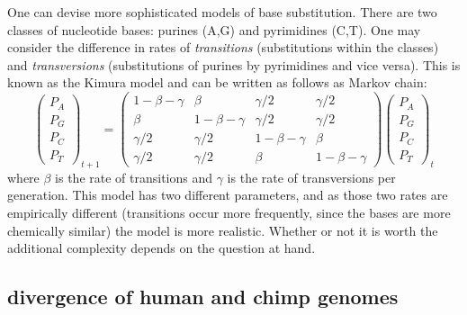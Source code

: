 \documentclass[
]{book}
\theoremstyle{definition}
\theoremstyle{definition}
\theoremstyle{definition}
\theoremstyle{remark}
\begin{document}
One can devise more sophisticated models of base substitution. There are two classes of nucleotide bases: purines (A,G) and pyrimidines (C,T). One may consider the difference in rates of \emph{transitions} (substitutions within the classes) and \emph{transversions} (substitutions of purines by pyrimidines and vice versa). This is known as the Kimura model and can be written as follows as Markov chain:
\[   \left(\begin{array}{c} P_A \\ P_G \\ P_C \\ P_T \end{array}\right)_{t+1}  = \left(\begin{array}{cccc}1-\beta-\gamma & \beta & \gamma/2 &  \gamma/2 \\ \beta  & 1-\beta-\gamma & \gamma/2 & \gamma/2 \\ \gamma/2 & \gamma/2 & 1-\beta-\gamma& \beta  \\ \gamma/2 &\gamma/2 & \beta  & 1-\beta-\gamma \end{array}\right) \left(\begin{array}{c} P_A \\ P_G \\ P_C \\ P_T \end{array}\right)_t \]
where \(\beta\) is the rate of transitions and \(\gamma\) is the rate of transversions per generation. This model has two different parameters, and as those two rates are empirically different (transitions occur more frequently, since the bases are more chemically similar) the model is more realistic. Whether or not it is worth the additional complexity depends on the question at hand.

\hypertarget{divergence-of-human-and-chimp-genomes}{%
\subsection{divergence of human and chimp genomes}\label{divergence-of-human-and-chimp-genomes}}
\end{document}
